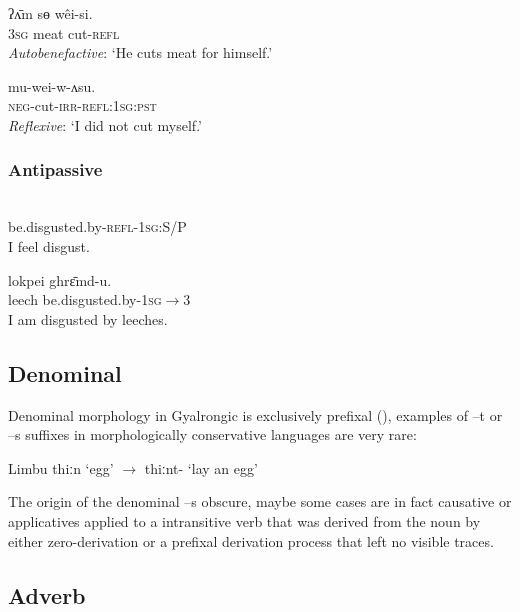 \documentclass[oldfontcommands,oneside,a4paper,11pt]{article}
\newcommand{\ipa}[1]{{\phon \mbox{#1}}} %
\begin{document}
\begin{exe}
\ex \label{ex:weisi2} 
\gll 
 \ipa{ʔʌ̄m} \ipa{sɵ}  	\ipa{wêi-si.}  \\
\textsc{3sg} meat cut-\textsc{refl} \\
\glt \textit{Autobenefactive}: `He cuts meat for himself.'
\end{exe}
 
\begin{exe}
\ex \label{ex:weiwasu} 
\gll 
	\ipa{mu-wei-w-ʌsu.}  \\
\textsc{neg}-cut-\textsc{irr}-\textsc{refl:1sg:pst} \\
\glt \textit{Reflexive}: `I did not cut myself.'
\end{exe}  
\subsubsection{Antipassive} 
\begin{exe}
\ex \label{ex:ghryamtsi} 
\gll \ipa{gʰrɛ̄m-si-ŋʌ}\\
 be.disgusted.by-\textsc{refl-1sg:S/P} \\
\glt  I feel disgust.
\end{exe}

\begin{exe}
\ex \label{ex:ghryamt} 
\gll 
  	\ipa{lokpei}  	\ipa{ghrɛ̄md-u.}  \\
leech  be.disgusted.by-\textsc{1sg$\rightarrow$3} \\
 \glt  I am disgusted by leeches.
\end{exe}
\subsection{Denominal}
Denominal morphology in Gyalrongic is exclusively prefixal (\citealt{jacques14antipassive}), examples of \ipa{--t} or \ipa{--s} suffixes in morphologically conservative languages are very rare:

Limbu \ipa{thiːn} `egg' $\rightarrow$ \ipa{thiːnt-} `lay an egg'

The origin of the denominal \ipa{--s} obscure, maybe some cases are in fact causative or applicatives applied to a intransitive verb that was derived from the noun by either zero-derivation or a prefixal derivation process that left no visible traces.

\subsection{Adverb}
\end{document}
